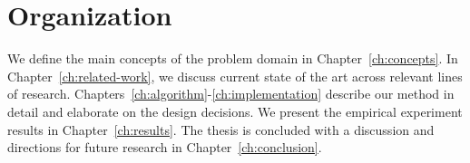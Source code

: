 

\section{Organization}

We define the main concepts of the problem domain in Chapter~\ref{ch:concepts}. In Chapter~\ref{ch:related-work}, we discuss current state of the art across relevant lines of research. Chapters~\ref{ch:algorithm}-\ref{ch:implementation} describe our method in detail and elaborate on the design decisions. We present the empirical experiment results in Chapter~\ref{ch:results}. The thesis is concluded with a discussion and directions for future research in Chapter~\ref{ch:conclusion}.


